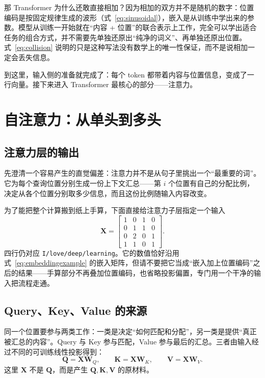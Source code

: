 \documentclass[UTF8,a4paper,12pt]{ctexart}
\numberwithin{equation}{section}
\begin{document}
那 Transformer 为什么还敢直接相加？因为相加的双方并不是随机的数字：位置编码是按固定规律生成的波形（式~\eqref{eq:sinusoidal}），嵌入是从训练中学出来的参数。模型从训练一开始就在``内容 + 位置''的联合表示上工作，完全可以学出适合任务的组合方式，并不需要先单独还原出``纯净的词义''、再单独还原出位置。式~\eqref{eq:collision} 说明的只是这种写法没有数学上的唯一性保证，而不是说相加一定会丢失信息。

到这里，输入侧的准备就完成了：每个 token 都带着内容与位置信息，变成了一行向量。接下来进入 Transformer 最核心的部分——注意力。

\section{自注意力：从单头到多头}
\label{sec:singleattention}

\subsection{注意力层的输出}

先澄清一个容易产生的直觉偏差：注意力并不是从句子里挑出一个``最重要的词''。它为每个查询位置分别生成一份上下文汇总——第 $i$ 个位置有自己的分配比例，决定从各个位置分别取多少信息，而且这份比例随输入内容改变。

为了能把整个计算搬到纸上手算，下面直接给注意力子层指定一个输入
\begin{equation}
\bm X=
\begin{bmatrix}
1&0&1&0\\
0&1&1&0\\
0&2&0&1\\
1&1&0&1
\end{bmatrix}.
\label{eq:toyX}
\end{equation}
四行仍对应 \texttt{I/love/deep/learning}。它的数值恰好沿用式~\eqref{eq:embeddingexample} 的嵌入矩阵，但请不要把它当成``嵌入加上位置编码''之后的结果——手算部分不再叠加位置编码，也省略投影偏置，专门用一个干净的输入把流程走通。

\subsection{Query、Key、Value 的来源}

同一个位置要参与两类工作：一类是决定``如何匹配和分配''，另一类是提供``真正被汇总的内容''。Query 与 Key 参与匹配，Value 参与最后的汇总。三者由输入经过不同的可训练线性投影得到：
\begin{equation}
\bm Q=\bm X\bm W_Q,\qquad
\bm K=\bm X\bm W_K,\qquad
\bm V=\bm X\bm W_V.
\label{eq:qkv}
\end{equation}
这里 $\bm X$ 不是 $\bm Q$，而是产生 $\bm Q,\bm K,\bm V$ 的原材料。
\end{document}
